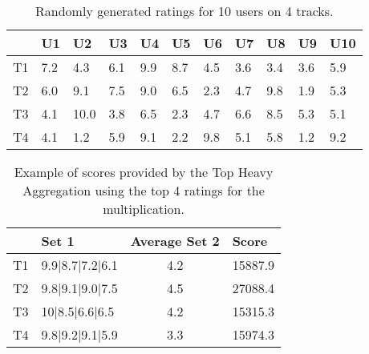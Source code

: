\begin{table}[H]
	\centering
	\begin{tabular}{|l|l|l|l|l|l|l|l|l|l|l|}
		\hline
		& U1  & U2   & U3  & U4  & U5  & U6  & U7  & U8  & U9  & U10 \\ \hline
		T1 & 7.2 & 4.3  & 6.1 & 9.9 & 8.7 & 4.5 & 3.6 & 3.4 & 3.6 & 5.9 \\ \hline
		T2 & 6.0 & 9.1  & 7.5 & 9.0 & 6.5 & 2.3 & 4.7 & 9.8 & 1.9 & 5.3 \\ \hline
		T3 & 4.1 & 10.0 & 3.8 & 6.5 & 2.3 & 4.7 & 6.6 & 8.5 & 5.3 & 5.1 \\ \hline
		T4 & 4.1 & 1.2  & 5.9 & 9.1 & 2.2 & 9.8 & 5.1 & 5.8 & 1.2 & 9.2 \\ \hline
	\end{tabular}
	\caption{Randomly generated ratings for 10 users on 4 tracks.}
	\label{tbl:randomdatasample}
\end{table}

\begin{table}[H]
	\centering
	\begin{tabular}{|l|l|c|l|}
		\hline
		& Set 1           & \multicolumn{1}{l|}{Average Set 2} & Score   \\ \hline
		T1 & 9.9|8.7|7.2|6.1 & 4.2                                & 15887.9 \\ \hline
		T2 & 9.8|9.1|9.0|7.5 & 4.5                                & 27088.4 \\ \hline
		T3 & 10|8.5|6.6|6.5  & 4.2                                & 15315.3 \\ \hline
		T4 & 9.8|9.2|9.1|5.9 & 3.3                                & 15974.3 \\ \hline
	\end{tabular}
	\caption{Example of scores provided by the Top Heavy Aggregation using the top 4 ratings for the multiplication.}
	\label{tbl:topheavyaggregation}
\end{table}

